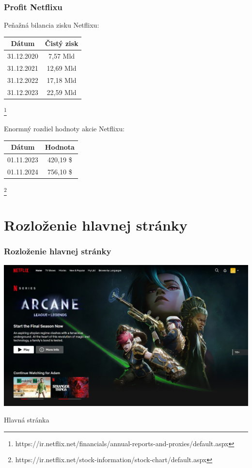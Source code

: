 \documentclass{beamer}
\newcommand{\footcite}[1]{\footnote{\tiny #1}}
\begin{document}
\begin{frame}[fragile=singleslide]\frametitle{Profit Netflixu}


    \begin{center}
        Peňažná bilancia zisku Netflixu:
        \vspace{0.2cm}

        \begin{tabular}{||c c||}
            \hline
            Dátum      & Čistý zisk \\ [0.5ex]
            \hline\hline
            31.12.2020 & 7,57 Mld   \\
            \hline
            31.12.2021 & 12,69 Mld  \\
            \hline
            31.12.2022 & 17,18 Mld  \\
            \hline
            31.12.2023 & 22,59 Mld  \\
            \hline
        \end{tabular}
        \footcite{https://ir.netflix.net/financials/annual-reports-and-proxies/default.aspx}

        \vspace{0.4cm}
        Enormný rozdiel hodnoty akcie Netflixu:

        \begin{tabular}{|c c|}
            \hline
            Dátum      & Hodnota    \\ [0.5ex]
            \hline\hline
            01.11.2023 & 420,19  \$ \\
            \hline
            01.11.2024 & 756,10 \$  \\
            \hline
        \end{tabular}
        \footcite{https://ir.netflix.net/stock-information/stock-chart/default.aspx}
    \end{center}
\end{frame}


\section{Rozloženie hlavnej stránky}

\begin{frame}[fragile=singleslide]\frametitle{Rozloženie hlavnej stránky}

    \includegraphics[scale=.26]{NetflixMainPage1.png}

    {\tiny Hlavná stránka}


\end{frame}
\end{document}
